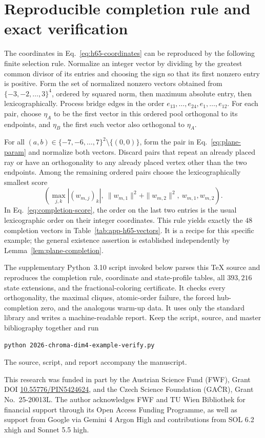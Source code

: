 \documentclass[
  aps,
  pra,
  reprint,
  superscriptaddress,
  amsmath,
  amssymb,
  nofootinbib,
  floatfix
]{revtex4-2}
\theoremstyle{definition}
\theoremstyle{remark}
\begin{document}
\section{Reproducible completion rule and exact verification}\label{app:verification}

The coordinates in Eq.~\eqref{eq:h65-coordinates} can be reproduced by the following finite selection rule. Normalize an integer vector by dividing by the greatest common divisor of its entries and choosing the sign so that its first nonzero entry is positive. Form the set of normalized nonzero vectors obtained from $\{-3,-2,\ldots,3\}^4$, ordered by squared norm, then maximum absolute entry, then lexicographically. Process bridge edges in the order $e_{13},\ldots,e_{24},e_1,\ldots,e_{12}$. For each pair, choose $\eta_A$ to be the first vector in this ordered pool orthogonal to its endpoints, and $\eta_B$ the first such vector also orthogonal to $\eta_A$.

For all $(a,b)\in\{-7,-6,\ldots,7\}^2\setminus\{(0,0)\}$, form the pair in Eq.~\eqref{eq:plane-param} and normalize both vectors. Discard pairs that repeat an already placed ray or have an orthogonality to any already placed vertex other than the two endpoints. Among the remaining ordered pairs choose the lexicographically smallest score
\begin{equation}\label{eq:completion-score}
\left(\max_{j,k}|(w_{m,j})_k|,\
\|w_{m,1}\|^2+\|w_{m,2}\|^2,\ w_{m,1},w_{m,2}\right).
\end{equation}
In Eq.~\eqref{eq:completion-score}, the order on the last two entries is the usual lexicographic order on their integer coordinates. This rule yields exactly the $48$ completion vectors in Table~\ref{tab:app-h65-vectors}. It is a recipe for this specific example; the general existence assertion is established independently by Lemma~\ref{lem:plane-completion}.

The supplementary Python~3.10 script invoked below parses this TeX source and reproduces the completion rule, coordinate and state-profile tables, all $393{,}216$ state extensions, and the fractional-coloring certificate. It checks every orthogonality, the maximal cliques, atomic-order failure, the forced hub-completion zero, and the analogous warm-up data. It uses only the standard library and writes a machine-readable report. Keep the script, source, and master bibliography together and run
\begin{verbatim}
python 2026-chroma-dim4-example-verify.py
\end{verbatim}
The source, script, and report accompany the manuscript.

\begin{acknowledgments}
This research was funded in part by the Austrian Science Fund (FWF), Grant DOI \href{https://doi.org/10.55776/PIN5424624}{10.55776/PIN5424624}, and the Czech Science Foundation (GA\v{C}R), Grant No.~25-20013L.
The author acknowledges FWF and TU Wien Bibliothek for financial support through its Open Access Funding Programme, as well as support from Google via Gemini 4 Argon High and contributions from SOL 6.2 xhigh and Sonnet 5.5 high.
\end{acknowledgments}


\end{document}
